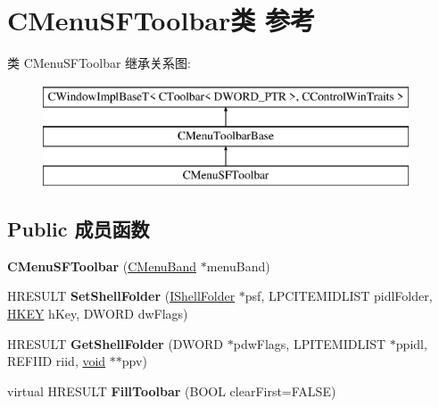 \hypertarget{class_c_menu_s_f_toolbar}{}\section{C\+Menu\+S\+F\+Toolbar类 参考}
\label{class_c_menu_s_f_toolbar}
类 C\+Menu\+S\+F\+Toolbar 继承关系图\+:\begin{figure}[H]
\begin{center}
\leavevmode
\includegraphics[height=3.000000cm]{class_c_menu_s_f_toolbar}
\end{center}
\end{figure}
\subsection*{Public 成员函数}
\begin{DoxyCompactItemize}
\item 
\mbox{\label{class_c_menu_s_f_toolbar_aadbf86e988bcee7b481bb962b8a182eb}} 
{\bfseries C\+Menu\+S\+F\+Toolbar} (\hyperlink{class_c_menu_band}{C\+Menu\+Band} $\ast$menu\+Band)
\item 
\mbox{\label{class_c_menu_s_f_toolbar_a11e2c19acd45ffd092912eb3e44778b4}} 
H\+R\+E\+S\+U\+LT {\bfseries Set\+Shell\+Folder} (\hyperlink{interface_i_shell_folder}{I\+Shell\+Folder} $\ast$psf, L\+P\+C\+I\+T\+E\+M\+I\+D\+L\+I\+ST pidl\+Folder, \hyperlink{interfacevoid}{H\+K\+EY} h\+Key, D\+W\+O\+RD dw\+Flags)
\item 
\mbox{\label{class_c_menu_s_f_toolbar_a4fa473a390610d2b5ddae1bd257d51ca}} 
H\+R\+E\+S\+U\+LT {\bfseries Get\+Shell\+Folder} (D\+W\+O\+RD $\ast$pdw\+Flags, L\+P\+I\+T\+E\+M\+I\+D\+L\+I\+ST $\ast$ppidl, R\+E\+F\+I\+ID riid, \hyperlink{interfacevoid}{void} $\ast$$\ast$ppv)
\item 
\mbox{\label{class_c_menu_s_f_toolbar_a617f5e4caa7bf59f65c6c11ca4d1e8c8}} 
virtual H\+R\+E\+S\+U\+LT {\bfseries Fill\+Toolbar} (B\+O\+OL clear\+First=F\+A\+L\+SE)
\end{DoxyCompactItemize}
